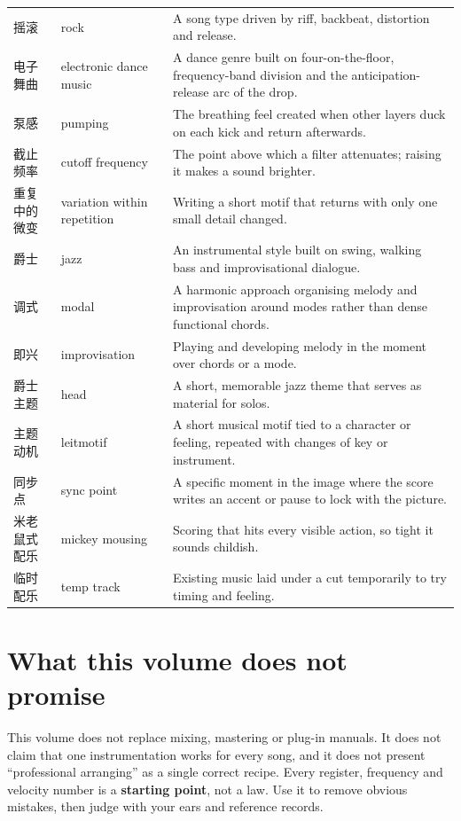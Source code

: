 \begin{longtable}{p{}p{}p{}}
摇滚 & rock & A song type driven by riff, backbeat, distortion and release. \\
电子舞曲 & electronic dance music & A dance genre built on four-on-the-floor, frequency-band division and the anticipation-release arc of the drop. \\
泵感 & pumping & The breathing feel created when other layers duck on each kick and return afterwards. \\
截止频率 & cutoff frequency & The point above which a filter attenuates; raising it makes a sound brighter. \\
重复中的微变 & variation within repetition & Writing a short motif that returns with only one small detail changed. \\
爵士 & jazz & An instrumental style built on swing, walking bass and improvisational dialogue. \\
调式 & modal & A harmonic approach organising melody and improvisation around modes rather than dense functional chords. \\
即兴 & improvisation & Playing and developing melody in the moment over chords or a mode. \\
爵士主题 & head & A short, memorable jazz theme that serves as material for solos. \\
主题动机 & leitmotif & A short musical motif tied to a character or feeling, repeated with changes of key or instrument. \\
同步点 & sync point & A specific moment in the image where the score writes an accent or pause to lock with the picture. \\
米老鼠式配乐 & mickey mousing & Scoring that hits every visible action, so tight it sounds childish. \\
临时配乐 & temp track & Existing music laid under a cut temporarily to try timing and feeling. \\
\bottomrule
\end{longtable}

\section*{What this volume does not promise}

This volume does not replace mixing, mastering or plug-in manuals. It does not claim that one instrumentation works for every song, and it does not present ``professional arranging'' as a single correct recipe. Every register, frequency and velocity number is a \textbf{starting point}, not a law. Use it to remove obvious mistakes, then judge with your ears and reference records.

